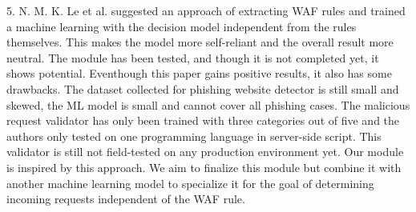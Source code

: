 5.	N. M. K. Le et al. \cite{Khoi} suggested an approach of extracting WAF rules and trained a machine learning with the decision model independent from the rules themselves. This makes the model more self-reliant and the overall result more neutral. The module has been tested, and though it is not completed yet, it shows potential. Eventhough this paper gains positive results, it also has some drawbacks. The dataset collected for phishing website detector is still small and skewed, the ML model is small and cannot cover all phishing cases. The malicious request validator has only been trained with three categories out of five and the authors only tested on one programming language in server-side script. This validator is still not field-tested on any production environment yet. Our module is inspired by this approach. We aim to finalize this module but combine it with another machine learning model to specialize it for the goal of determining incoming requests independent of the WAF rule.

